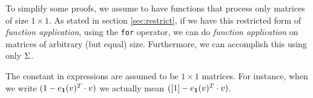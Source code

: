 To simplify some proofs, we assume \langfor to have functions that process only matrices of size $1\times 1$.
As stated in section \ref{sec:restrict}, if we have this restricted form of \textit{function application},
using the \texttt{for} operator, we can do \textit{function application} on matrices of arbitrary (but equal) size.
Furthermore, we can accomplish this using only $\Sigma$.

The constant in expressions are assumed to be $1\times 1$ matrices. 
For instance, when we write $(1-e_{\mathbf{1}}(v)^T\cdot v)$ we actually mean $([1]-e_{\mathbf{1}}(v)^T\cdot v)$.